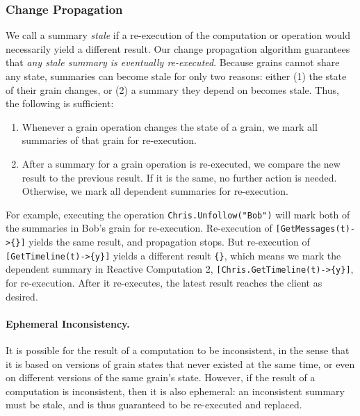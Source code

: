 \subsubsection{Change Propagation}\label{sec:cp}

We call a summary \emph{stale} if a re-execution of the computation or operation would necessarily yield a different result. Our change propagation algorithm guarantees that \emph{any stale summary is eventually re-executed}. Because grains cannot share any state, summaries can become stale for only two reasons: either (1) the state of their grain changes, or (2) a summary they depend on becomes stale. Thus, the following is sufficient:
\begin{enumerate}
\item Whenever a grain operation changes the state of a grain, we mark all summaries of that grain for re-execution.
\item After a summary for a grain operation is re-executed, we compare the new result to the previous result. If it is the same, no further action is needed. Otherwise, we mark all dependent summaries for re-execution.
\end{enumerate}
 
\noindent For example, executing the operation \lstinline|Chris.Unfollow("Bob")| will mark both of the summaries in Bob's grain for re-execution. Re-execution of \lstinline|[GetMessages(t)->{}]| yields the same result, and propagation stops. But re-execution of \lstinline|[GetTimeline(t)->{y}]| yields a different result \lstinline|{}|, which means we mark the dependent summary in Reactive Computation 2, \lstinline|[Chris.GetTimeline(t)->{y}]|, for re-execution. After it re-executes, the latest result reaches the client as desired.

\paragraph{Ephemeral Inconsistency. }  
It is possible for the result of a computation to be inconsistent, in the sense that it is based on versions of grain states that never existed at the same time, or even on different versions of the same grain's state. However, if the result of a computation is inconsistent, then it is also ephemeral: an inconsistent summary must be stale, and is thus guaranteed to be re-executed and replaced.

